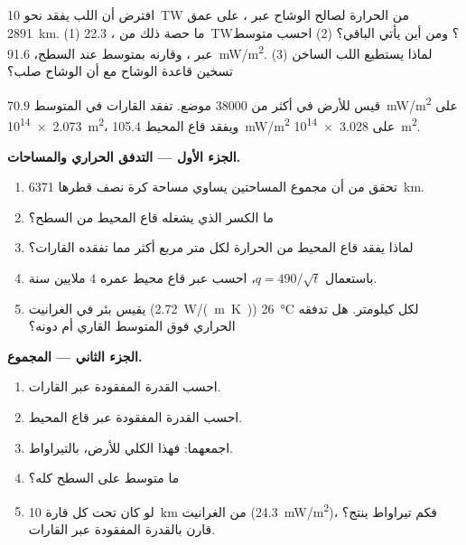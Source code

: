 \begin{exercise}[$\star\star\star$]\label{exo:g12:internal-heat:15}
افترض أن اللب يفقد نحو \qty{10}{TW} من الحرارة لصالح الوشاح عبر
، على عمق \qty{2891}{km}. (1) ما حصة ذلك من
، \qty{22.3}{TW}؟ ومن أين يأتي الباقي؟
(2) احسب متوسط  عبر ، وقارنه بمتوسط  عند السطح،
\qty{91.6}{mW/m^2}. (3) لماذا يستطيع اللب الساخن تسخين قاعدة الوشاح
مع أن الوشاح صلب؟
\end{exercise}

\begin{problem}
\label{pb:g12:internal-heat:1}
قيس  للأرض في أكثر من \num{38000} موضع.
تفقد القارات في المتوسط \qty{70.9}{mW/m^2} على \qty{2.073e14}{m^2}،
ويفقد قاع المحيط \qty{105.4}{mW/m^2} على \qty{3.028e14}{m^2}.

\medskip
\noindent\textbf{الجزء الأول --- التدفق الحراري والمساحات.}
\begin{enumerate}
  \item تحقق من أن مجموع المساحتين يساوي مساحة كرة نصف قطرها
        \qty{6371}{km}.
  \item ما الكسر الذي يشغله قاع المحيط من السطح؟
  \item لماذا يفقد قاع المحيط من الحرارة لكل متر مربع أكثر مما تفقده
        القارات؟
  \item باستعمال $q = 490/\sqrt{t}$، احسب  عبر قاع محيط
        عمره 4 ملايين سنة.
  \item يقيس بئر في الغرانيت (\qty{2.72}{W/(m.K)})
        \qty{26}{\celsius} لكل كيلومتر. هل تدفقه الحراري فوق المتوسط
        القاري أم دونه؟
\end{enumerate}

\medskip
\noindent\textbf{الجزء الثاني --- المجموع.}
\begin{enumerate}[resume]
  \item احسب القدرة المفقودة عبر القارات.
  \item احسب القدرة المفقودة عبر قاع المحيط.
  \item اجمعهما: فهذا  الكلي للأرض، بالتيراواط.
  \item ما متوسط  على السطح كله؟
  \item لو كان تحت كل قارة \qty{10}{km} من الغرانيت (\qty{24.3}{mW/m^2})،
        فكم تيراواط ينتج؟ قارن بالقدرة المفقودة
        عبر القارات.
\end{enumerate}


\end{problem}
